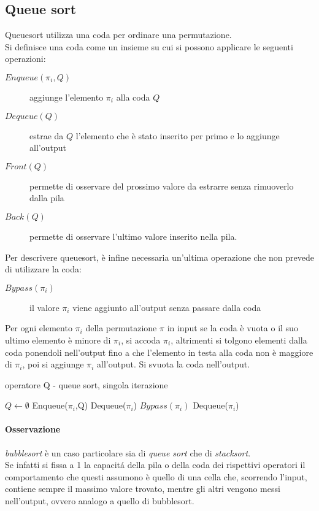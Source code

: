 \subsection*{Queue sort}
Queuesort utilizza una coda per ordinare una permutazione.\\
Si definisce una coda come un insieme su cui si possono applicare le seguenti operazioni:
\begin{description}
   \item[$Enqueue(\pi_i,Q)$] aggiunge l'elemento $\pi_i$ alla coda $Q$
   \item[$Dequeue(Q)$] estrae da $Q$ l'elemento che \`e stato inserito per primo e lo aggiunge all'output
   \item[$Front(Q)$] permette di osservare del prossimo valore da estrarre senza rimuoverlo dalla pila
   \item[$Back(Q)$] permette di osservare l'ultimo valore inserito nella pila.
\end{description}
Per descrivere queuesort, \`e infine necessaria un'ultima operazione che non prevede di utilizzare la coda:\begin{description}\item[$Bypass(\pi_i)$] il valore $\pi_i$ viene aggiunto all'output senza passare dalla coda\end{description}
Per ogni elemento $\pi_i$ della permutazione $\pi$ in input se la coda \`e vuota o il suo ultimo elemento \`e minore di $\pi_i$, si accoda $\pi_i$, altrimenti si tolgono elementi dalla coda ponendoli nell'output fino a che l'elemento in testa alla coda non \`e maggiore di $\pi_i$, poi si aggiunge $\pi_i$ all'output. Si svuota la coda nell'output. 
\begin{algorithm}[H]
   \caption{operatore Q - queue sort, singola iterazione}
\begin{algorithmic}[1]
\State $Q\leftarrow\emptyset$
\State Enqueue($\pi_i$,Q)
\Else
{}
\State Dequeue($\pi_i$)
\EndWhile
\State $Bypass(\pi_i)$
\EndIf
\EndFor
{}
\State Dequeue($\pi_i$)
\EndWhile
\end{algorithmic}
\end{algorithm}
\paragraph*{Osservazione}\textit{bubblesort} \`e un caso particolare sia di \textit{queue sort} che di \textit{stacksort}.\\
Se infatti si fissa a 1 la capacit\'a della pila o della coda dei rispettivi operatori il comportamento che questi assumono \`e quello di una cella che, scorrendo l'input, contiene sempre il massimo valore trovato, mentre gli altri vengono messi nell'output, ovvero analogo a quello di bubblesort.
